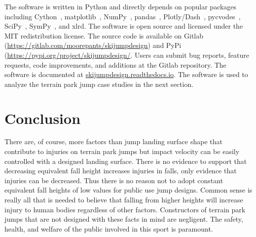 \documentclass{article}
\begin{document}
The software is written in Python and directly depends on popular packages
including Cython~\cite{Behnel2011}, matplotlib~\cite{Hunter2007},
NumPy~\cite{Oliphant2006}, pandas~\cite{McKinney2020},
Plotly/Dash~\cite{Plotly2015}, pycvodes~\cite{Dahlgren2018},
SciPy~\cite{Virtanen2020}, SymPy~\cite{Meurer2017}, and xlrd.
The software is open source and licensed under the MIT redistribution license.
The source code is available on Gitlab
(\url{https://gitlab.com/moorepants/skijumpdesign}) and PyPi
(\url{https://pypi.org/project/skijumpdesign/}. Users can submit bug reports, feature
requests, code improvements, and additions at the Gitlab repository. The
software is documented at
\href{https://skijumpdesign.readthedocs.io}{skijumpdesign.readthedocs.io}. The
software is used to analyze the terrain park jump case studies in the next
section.

\section{Conclusion}
%
There are, of course, more factors than jump landing surface shape that
contribute to injuries on terrain park jumps but impact velocity can be easily
controlled with a designed landing surface. There is no evidence to support
that decreasing equivalent fall height increases injuries in falls, only
evidence that injuries can be decreased. Thus there is no reason not to adopt
constant equivalent fall heights of low values for public use jump designs.
Common sense is really all that is needed to believe that falling from higher
heights will increase injury to human bodies regardless of other factors.
Constructors of terrain park jumps that are not designed with these facts in
mind are negligent. The safety, health, and welfare of the public involved in
this sport is paramount.





\appendix
\end{document}
